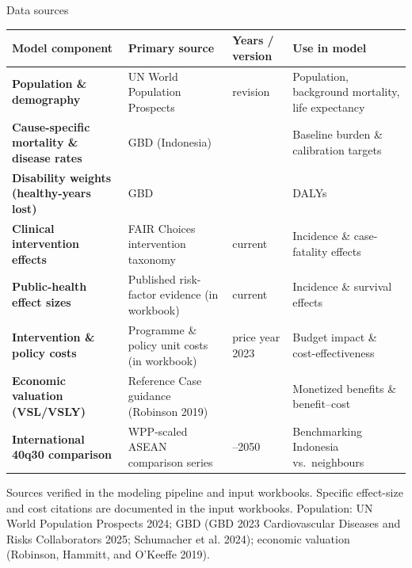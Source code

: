 \documentclass[
  ignorenonframetext,
  aspectratio=169]{beamer}
\begin{document}
\begin{frame}{Data sources}
\label{data-sources}
\begin{table}[!h]
\centering\begingroup\fontsize{7.4}{9.4}\selectfont

\begin{tabular}[t]{>{\raggedright\arraybackslash}p{3.4cm}>{\raggedright\arraybackslash}p{4.2cm}>{\raggedright\arraybackslash}p{2.0cm}>{\raggedright\arraybackslash}p{4.3cm}}
\toprule
\textbf{Model component} & \textbf{Primary source} & \textbf{Years / version} & \textbf{Use in model}\\
\midrule
\textbf{Population \& demography} & UN World Population Prospects & 2024 revision & Population, background mortality, life expectancy\\
\textbf{Cause-specific mortality \& disease rates} & GBD (Indonesia) & 2023 & Baseline burden \& calibration targets\\
\textbf{Disability weights (healthy-years lost)} & GBD & 2023 & DALYs\\
\textbf{Clinical intervention effects} & FAIR Choices intervention taxonomy & current & Incidence \& case-fatality effects\\
\textbf{Public-health effect sizes} & Published risk-factor evidence (in workbook) & current & Incidence \& survival effects\\
\addlinespace
\textbf{Intervention \& policy costs} & Programme \& policy unit costs (in workbook) & price year 2023 & Budget impact \& cost-effectiveness\\
\textbf{Economic valuation (VSL/VSLY)} & Reference Case guidance (Robinson 2019) & 2019 & Monetized benefits \& benefit--cost\\
\textbf{International 40q30 comparison} & WPP-scaled ASEAN comparison series & 1995--2050 & Benchmarking Indonesia vs.\ neighbours\\
\bottomrule
\end{tabular}
\endgroup{}
\end{table}

\vspace{1pt}

\scriptsize Sources verified in the modeling pipeline and input
workbooks. Specific effect-size and cost citations are documented in the
input workbooks. Population: UN World Population Prospects 2024; GBD
(GBD 2023 Cardiovascular Diseases and Risks Collaborators 2025;
Schumacher et al. 2024); economic valuation (Robinson, Hammitt, and
O'Keeffe 2019).
\end{frame}
\end{document}
